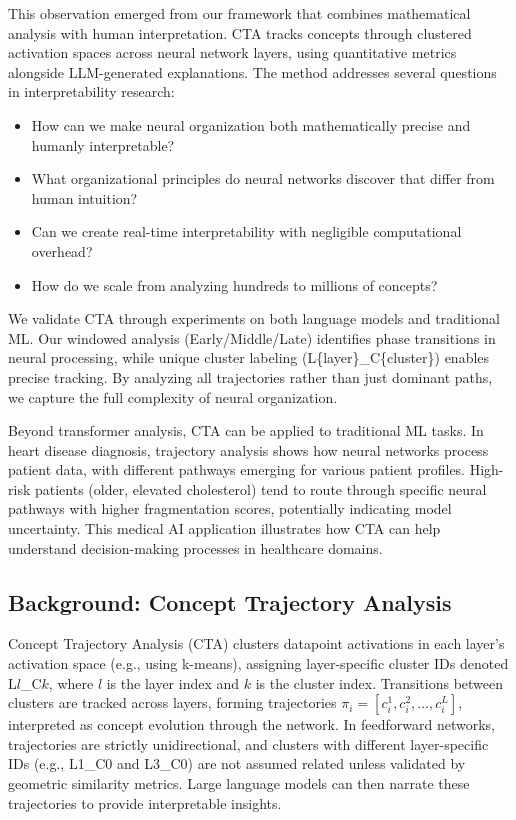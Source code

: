 This observation emerged from our framework that combines mathematical analysis with human interpretation. CTA tracks concepts through clustered activation spaces across neural network layers, using quantitative metrics alongside LLM-generated explanations. The method addresses several questions in interpretability research:

\begin{itemize}
    \item How can we make neural organization both mathematically precise and humanly interpretable?
    \item What organizational principles do neural networks discover that differ from human intuition?
    \item Can we create real-time interpretability with negligible computational overhead?
    \item How do we scale from analyzing hundreds to millions of concepts?
\end{itemize}

We validate CTA through experiments on both language models and traditional ML. Our windowed analysis (Early/Middle/Late) identifies phase transitions in neural processing, while unique cluster labeling (L\{layer\}\_C\{cluster\}) enables precise tracking. By analyzing all trajectories rather than just dominant paths, we capture the full complexity of neural organization.

Beyond transformer analysis, CTA can be applied to traditional ML tasks. In heart disease diagnosis, trajectory analysis shows how neural networks process patient data, with different pathways emerging for various patient profiles. High-risk patients (older, elevated cholesterol) tend to route through specific neural pathways with higher fragmentation scores, potentially indicating model uncertainty. This medical AI application illustrates how CTA can help understand decision-making processes in healthcare domains.

\subsection{Background: Concept Trajectory Analysis}

Concept Trajectory Analysis (CTA) clusters datapoint activations in each layer's activation space (e.g., using k-means), assigning layer-specific cluster IDs denoted L$l$\_C$k$, where $l$ is the layer index and $k$ is the cluster index. Transitions between clusters are tracked across layers, forming trajectories $\pi_i = [c_i^1, c_i^2, \dots, c_i^L]$, interpreted as concept evolution through the network. In feedforward networks, trajectories are strictly unidirectional, and clusters with different layer-specific IDs (e.g., L1\_C0 and L3\_C0) are not assumed related unless validated by geometric similarity metrics. Large language models can then narrate these trajectories to provide interpretable insights.

